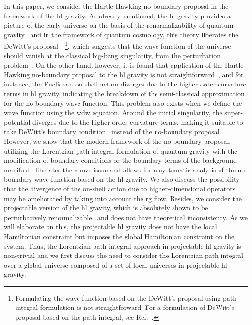 \documentclass[superscriptaddress,aps,preprintnumbers,nofootinbib]{revtex4-2}
\begin{document}
In this paper, we consider the Hartle-Hawking no-boundary proposal in the framework of the \ac{hl} gravity. As already mentioned, the \ac{hl} gravity provides a picture of the early universe on the basis of the renormalizability of quantum gravity~\cite{Mukohyama:2009gg,Bramberger:2017tid} and in the framework of quantum cosmology, this theory liberates the DeWitt's proposal~\cite{DeWitt:1967yk}~\footnote{Formulating the wave function based on the DeWitt's proposal using path integral formulation is not straightforward. For a formulation of DeWitt's proposal based on the path integral, see Ref.~\cite{Matsui:2023tkw}.}, which suggests that the wave function of the universe should vanish at the classical big-bang singularity, from the perturbation problem~\cite{Matsui:2021yte,Martens:2022dtd}. On the other hand, however, it is found that application of the Hartle-Hawking no-boundary proposal to the \ac{hl} gravity is not straightforward~\cite{Bertolami:2011ka,Bramberger:2017tid}, and for instance, the Euclidean on-shell action diverges due to the higher-order curvature terms in \ac{hl} gravity, indicating the breakdown of the semi-classical approximation for the no-boundary wave function. This problem also exists when we define the wave function using the \ac{wdw} equation. Around the initial singularity, the super-potential diverges due to the higher-order curvature terms, making it suitable to take DeWitt's boundary condition~\cite{DeWitt:1967yk} instead of the no-boundary proposal. However, we show that the modern framework of the no-boundary proposal, utilizing the Lorentzian path integral formulation of quantum gravity with the modification of boundary conditions or the boundary terms of the background manifold~\cite{DiTucci:2019dji,DiTucci:2019bui} liberates the above issue and allows for a systematic analysis of the no-boundary wave function based on the \ac{hl} gravity. We also discuss the possibility that the divergence of the on-shell action due to higher-dimensional operators may be ameliorated by taking into account the \ac{rg} flow. Besides, we consider the projectable version of the \ac{hl} gravity, which is absolutely shown to be perturbatively renormalizable~\cite{Barvinsky:2015kil,Barvinsky:2017zlx} and does not have theoretical inconsistency. As we will elaborate on this, the projectable \ac{hl} gravity does not have the local Hamiltonian constraint but imposes the global Hamiltonian constraint on the system. Thus, the Lorentzian path integral approach in projectable \ac{hl} gravity is non-trivial and we first discuss the need to consider the Lorentzian path integral over a global universe composed of a set of local universes in projectable \ac{hl} gravity.
\end{document}

